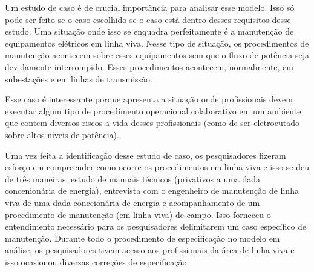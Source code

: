 Um estudo de caso é de crucial importância para analisar esse modelo. Isso só pode ser feito se o caso escolhido se o caso está dentro desses requisitos desse estudo. Uma situação onde isso se enquadra perfeitamente é a manutenção de equipamentos elétricos em linha viva. Nesse tipo de situação, os procedimentos de manutenção acontecem sobre esses equipamentos sem que o fluxo de potência seja devidamente interrompido. Esses procedimentos acontecem, normalmente, em subestações e em linhas de transmissão. 

Esse caso é interessante porque apresenta a situação onde profissionais devem executar algum tipo de procedimento operacional colaborativo em um ambiente que contem diversos riscos a vida desses profissionais (como de ser eletrocutado sobre altos níveis de potência).

Uma vez feita a identificação desse estudo de caso, os pesquisadores fizeram esforço em compreender como ocorre os procedimentos em linha viva e isso se deu de três maneiras; 
estudo de manuais técnicos (privativos a uma dada concenionária de energia), entrevista com o engenheiro de manutenção de linha viva de uma dada conceionária de energia e acompanhamento de um procedimento de manutenção (em linha viva) de campo. Isso forneceu o entendimento necessário para os pesquisadores delimitarem um caso específico de manutenção. Durante todo o procedimento de especificação no modelo em análise, os pesquisadores tivem acesso aos profissionais da área de linha viva e isso ocasionou diversas correções de especificação.  